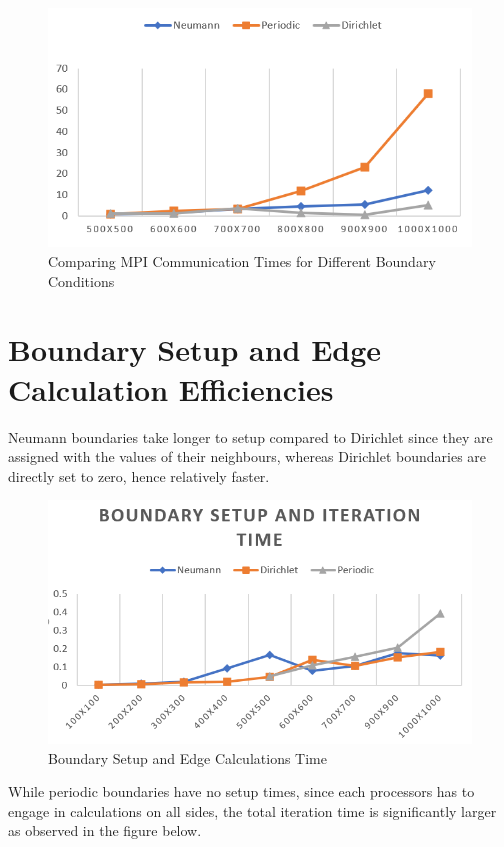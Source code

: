 \documentclass[twoside,twocolumn]{article}
\begin{document}
\vspace{-4mm}
\begin{figure}[H]
\centering
\includegraphics[height=5.5 cm\textwidth]{images/mpicomms2.png}
\caption{Comparing MPI Communication Times for Different Boundary Conditions}
\end{figure}
\vspace{-4mm}
\section{Boundary Setup and Edge Calculation Efficiencies}
Neumann boundaries take longer to setup compared to Dirichlet since they are assigned with the values of their neighbours, whereas Dirichlet boundaries are directly set to zero, hence relatively faster.\\ 
\vspace{-4mm}
\begin{figure}[H]
\centering
\includegraphics[height=5.5 cm\textwidth]{images/boundrysetup.png}
\caption{Boundary Setup and Edge Calculations Time}
\end{figure}
\vspace{-4mm}
While periodic boundaries have no setup times, since each processors has to engage in calculations on all sides, the total iteration time is significantly larger as observed in the figure below.\\
\end{document}
